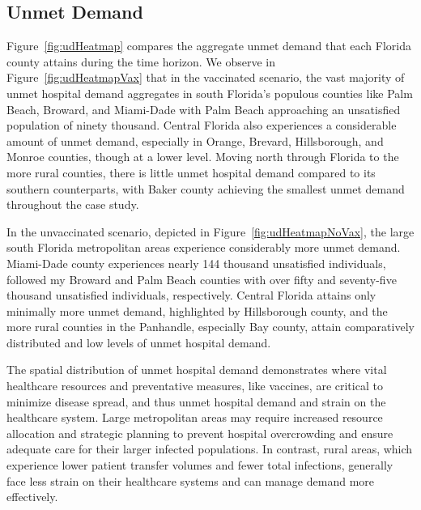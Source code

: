 \documentclass{article}
\begin{document}
\subsection{Unmet Demand}
Figure~\ref{fig:udHeatmap} compares the aggregate unmet demand that each Florida county attains during the time horizon. We observe in Figure~\ref{fig:udHeatmapVax} that in the vaccinated scenario, the vast majority of unmet hospital demand aggregates in south Florida's populous counties like Palm Beach, Broward, and Miami-Dade with Palm Beach approaching an unsatisfied population of ninety thousand. Central Florida also experiences a considerable amount of unmet demand, especially in Orange, Brevard, Hillsborough, and Monroe counties, though at a lower level. Moving north through Florida to the more rural counties, there is little unmet hospital demand compared to its southern counterparts, with Baker county achieving the smallest unmet demand throughout the case study. 

In the unvaccinated scenario, depicted in Figure~\ref{fig:udHeatmapNoVax}, the large south Florida metropolitan areas experience considerably more unmet demand. Miami-Dade county experiences nearly 144 thousand unsatisfied individuals, followed my Broward and Palm Beach counties with over fifty and seventy-five thousand unsatisfied individuals, respectively. Central Florida attains only minimally more unmet demand, highlighted by Hillsborough county, and the more rural counties in the Panhandle, especially Bay county, attain comparatively distributed and low levels of unmet hospital demand. 

The spatial distribution of unmet hospital demand demonstrates where vital healthcare resources and preventative measures, like vaccines, are critical to minimize disease spread, and thus unmet hospital demand and strain on the healthcare system. Large metropolitan areas may require increased resource allocation and strategic planning to prevent hospital overcrowding and ensure adequate care for their larger infected populations. In contrast, rural areas, which experience lower patient transfer volumes and fewer total infections, generally face less strain on their healthcare systems and can manage demand more effectively.
\end{document}

